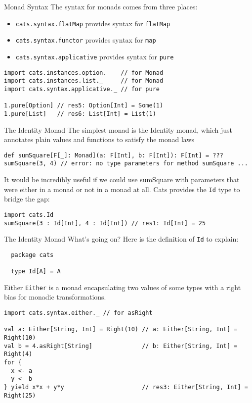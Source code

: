 \documentclass[aspectratio=169]{beamer}
\begin{document}
\begin{frame}[fragile]{Monad Syntax}
The syntax for monads comes from three places:
\begin{itemize}
  \item \texttt{cats.syntax.flatMap} provides syntax for \texttt{flatMap}
  \item \texttt{cats.syntax.functor} provides syntax for \texttt{map}
  \item \texttt{cats.syntax.applicative} provides syntax for \texttt{pure}
\end{itemize}
\bigskip
\begin{verbatim}
import cats.instances.option._   // for Monad
import cats.instances.list._     // for Monad
import cats.syntax.applicative._ // for pure

1.pure[Option] // res5: Option[Int] = Some(1)
1.pure[List]   // res6: List[Int] = List(1)
\end{verbatim}
\end{frame}

\begin{frame}[fragile]{The Identity Monad}
The simplest monad is the Identity monad, which just annotates plain values and functions to satisfy
the monad laws

\begin{verbatim}
def sumSquare[F[_]: Monad](a: F[Int], b: F[Int]): F[Int] = ???
sumSquare(3, 4) // error: no type parameters for method sumSquare ...
\end{verbatim}
\bigskip
It would be incredibly useful if we could use sumSquare with parameters that were either in a monad
or not in a monad at all. Cats provides the \texttt{Id} type to bridge the gap:
\begin{verbatim}
import cats.Id
sumSquare(3 : Id[Int], 4 : Id[Int]) // res1: Id[Int] = 25
\end{verbatim}
\end{frame}

\begin{frame}[fragile]{The Identity Monad}
  What’s going on? Here is the definition of \texttt{Id} to explain:
  \bigskip
  \begin{verbatim}
  package cats

  type Id[A] = A
  \end{verbatim}
\end{frame}

\begin{frame}[fragile]{Either}
\texttt{Either} is a monad encapsulating two values of some types with a right bias for monadic
transformations.
\begin{verbatim}
import cats.syntax.either._ // for asRight

val a: Either[String, Int] = Right(10) // a: Either[String, Int] = Right(10)
val b = 4.asRight[String]              // b: Either[String, Int] = Right(4)
for {
  x <- a
  y <- b
} yield x*x + y*y                      // res3: Either[String, Int] = Right(25)
\end{verbatim}
\end{frame}
\end{document}
